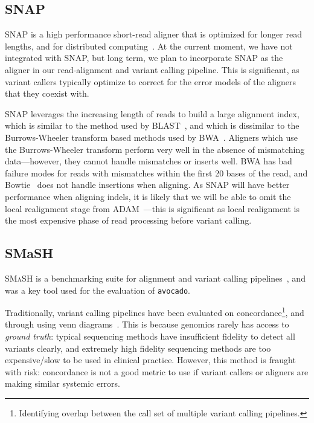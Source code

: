 \documentclass{acm_proc_article-sp}
\begin{document}
\subsection{SNAP}
\label{sec:snap}


SNAP is a high performance short-read aligner that is optimized for longer read lengths, and for distributed computing~\cite{zaharia11}.
At the current moment, we have not integrated with SNAP, but long term, we plan to incorporate SNAP as the aligner in our read-alignment
and variant calling pipeline. This is significant, as variant callers typically optimize to correct for the error models of the aligners that they
coexist with.

SNAP leverages the increasing length of reads to build a large alignment index, which is similar to the method used by
BLAST~\cite{altschul90}, and which is dissimilar to the Burrows-Wheeler transform based methods used by BWA~\cite{li09bwa}. Aligners
which use the Burrows-Wheeler transform perform very well in the absence of mismatching data---however, they cannot handle mismatches
or inserts well. BWA has bad failure modes for reads with mismatches within the first 20 bases of the read, and Bowtie~\cite{langmead09}
does not handle insertions when aligning. As SNAP will have better performance when aligning indels, it is likely that we will be able to
omit the local realignment stage from ADAM~\cite{massie13}---this is significant as local realignment is the most expensive phase of
read processing before variant calling.

\subsection{SMaSH}
\label{sec:smash}


\textsc{SMaSH} is a benchmarking suite for alignment and variant calling pipelines~\cite{talwalkar13}, and was a key tool used for the
evaluation of \texttt{avocado}.

Traditionally, variant calling pipelines have been evaluated on concordance\footnote{Identifying overlap between the call set of multiple
variant calling pipelines.}, and through using venn diagrams~\cite{tao13}. This is because genomics rarely has access to \emph{ground
truth}: typical sequencing methods have insufficient fidelity to detect all variants clearly, and extremely high fidelity sequencing methods
are too expensive/slow to be used in clinical practice. However, this method is fraught with risk: concordance is not a good metric to use if
variant callers or aligners are making similar systemic errors.
\end{document}
